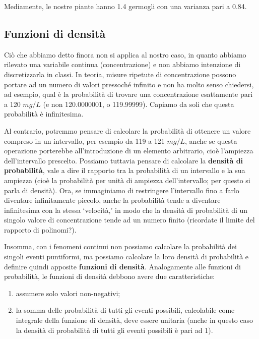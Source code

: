 \documentclass[a4paper,12pt,oneside]{book}
\providecommand{\tightlist}{%
  \setlength{\itemsep}{0pt}\setlength{\parskip}{0pt}}
\begin{document}
Mediamente, le nostre piante hanno 1.4 germogli con una varianza pari a 0.84.

\hypertarget{funzioni-di-densituxe0}{%
\subsection{Funzioni di densità}\label{funzioni-di-densituxe0}}

Ciò che abbiamo detto finora non si applica al nostro caso, in quanto abbiamo rilevato una variabile continua (concentrazione) e non abbiamo intenzione di discretizzarla in classi. In teoria, misure ripetute di concentrazione possono portare ad un numero di valori pressoché infinito e non ha molto senso chiedersi, ad esempio, qual è la probabilità di trovare una concentrazione esattamente pari a 120 \(mg/L\) (e non 120.0000001, o 119.99999). Capiamo da soli che questa probabilità è infinitesima.

Al contrario, potremmo pensare di calcolare la probabilità di ottenere un valore compreso in un intervallo, per esempio da 119 a 121 \(mg/L\), anche se questa operazione porterebbe all'introduzione di un elemento arbitrario, cioè l'ampiezza dell'intervallo prescelto. Possiamo tuttavia pensare di calcolare la \textbf{densità di probabilità}, vale a dire il rapporto tra la probabilità di un intervallo e la sua ampiezza (cioè la probabilità per unità di ampiezza dell'intervallo; per questo si parla di densità). Ora, se immaginiamo di restringere l'intervallo fino a farlo diventare infinitamente piccolo, anche la probabilità tende a diventare infinitesima con la stessa `velocità,' in modo che la densità di probabilità di un singolo valore di concentrazione tende ad un numero finito (ricordate il limite del rapporto di polinomi?).

Insomma, con i fenomeni continui non possiamo calcolare la probabilità dei singoli eventi puntiformi, ma possiamo calcolare la loro densità di probabilità e definire quindi apposite \textbf{funzioni di densità}. Analogamente alle funzioni di probabilità, le funzioni di densità debbono avere due caratteristiche:

\begin{enumerate}
\def\labelenumi{\arabic{enumi}.}
\tightlist
\item
  assumere solo valori non-negativi;
\item
  la somma delle probabilità di tutti gli eventi possibili, calcolabile come integrale della funzione di densità, deve essere unitaria (anche in questo caso la densità di probabilità di tutti gli eventi possibili è pari ad 1).
\end{enumerate}
\end{document}
